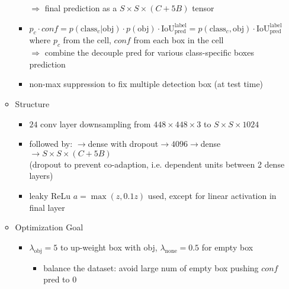 \begin{itemize}
\begin{itemize}
\begin{itemize}
		$\Rightarrow$ final prediction as a $S\times S \times (C+5B)$ tensor
		\item $p_c\cdot conf = p(\text{class}_c|\text{obj})\cdot p(\text{obj})\cdot \text{IoU}^\text{label}_\text{pred} = p(\text{class}_c, \text{obj}) \cdot \text{IoU}^\text{label}_\text{pred}$ \\
		where $p_c$ from the cell, $conf$ from each box in the cell \\
		$\Rightarrow$ combine the decouple pred for various class-specific boxes prediction
		\item non-max suppression to fix multiple detection box (at test time)
		\end{itemize}
	\item Structure
		\begin{itemize}
		\item $24$ conv layer downsampling from $448\times448\times3$ to $S\times S\times 1024$
		\item followed by: $\rightarrow$dense with dropout$\rightarrow4096\rightarrow$dense$\rightarrow S\times S\times (C+5B)$ \\
		(dropout to prevent co-adaption, i.e. dependent units between 2 dense layers)
		\item leaky ReLu $a=\max(z,0.1z)$ used, except for linear activation in final layer
		\end{itemize}
	\item Optimization Goal
		\begin{itemize}
		\Item \begin{align*} \displaystyle \text{loss} = & \lambda_\text{obj}\sum_{i=0}^{S^2}\sum_{j=0}^{B} \mathbf{1}^{obj}_{ij} [(x_i-\hat x_i)^2 + (y_i-\hat y_i)^2] +\\
		& \lambda_\text{obj}\sum_{i=0}^{S^2}\sum_{j=0}^{B}\mathbf 1^{obj}_{ij} [(\sqrt{w_i}-\sqrt{\hat w_i})^2 + (\sqrt{h_i}-\sqrt{\hat h_i})^2] + \\
		& \sum_{i=0}^{S^2}\sum_{j=0}^{B}\mathbf 1^{obj}_{ij} (conf_{ij} - \hat {conf}_{ij})^2 + \lambda_\text{none}\cdot\mathbf 1^{none}_{ij} (conf_{ij} - \hat {conf}_{ij})^2 +\\
		& \sum_{i=0}^{S^2}\mathbf 1^{obj}_{i}\sum_{c=0}^C (p_{ci} - \hat p_{ci})^2 \end{align*}
		\item $\lambda_\text{obj} = 5$ to up-weight box with obj, $\lambda_\text{none}=0.5$ for empty box
			\begin{itemize}
			\item balance the dataset: avoid large num of empty box pushing $conf$ pred to $0$

\end{itemize}
\end{itemize}
\end{itemize}
\end{itemize}
